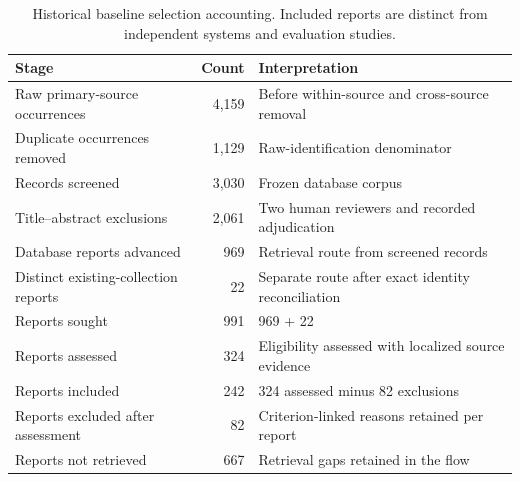 \documentclass[manuscript,review,screen]{acmart}
\begin{document}
\begin{table}[htbp]
\centering\small
\caption{Historical baseline selection accounting. Included reports are distinct from independent systems and evaluation studies.}
\label{tab:flow}
\begin{tabularx}{\linewidth}{Y r Y}
\toprule Stage & Count & Interpretation\\\midrule
Raw primary-source occurrences & 4,159 & Before within-source and cross-source removal\\
Duplicate occurrences removed & 1,129 & Raw-identification denominator\\
Records screened & 3,030 & Frozen database corpus\\
Title--abstract exclusions & 2,061 & Two human reviewers and recorded adjudication\\
Database reports advanced & 969 & Retrieval route from screened records\\
Distinct existing-collection reports & 22 & Separate route after exact identity reconciliation\\
Reports sought & 991 & 969 + 22\\
Reports assessed & 324 & Eligibility assessed with localized source evidence\\
Reports included & 242 & 324 assessed minus 82 exclusions\\
Reports excluded after assessment & 82 & Criterion-linked reasons retained per report\\
Reports not retrieved & 667 & Retrieval gaps retained in the flow\\\bottomrule
\end{tabularx}
\end{table}
\end{document}
